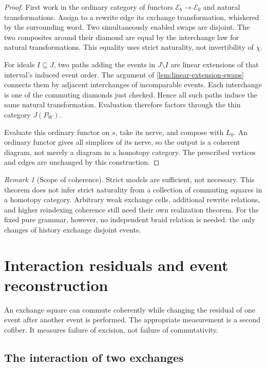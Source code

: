 \documentclass[11pt]{article}
\theoremstyle{definition}
\theoremstyle{remark}
\newtheorem{remark}[theorem]{Remark}
\begin{document}
\begin{proof}
First work in the ordinary category of functors $\mathcal E_b\to\mathcal E_0$ and natural transformations. Assign to a rewrite edge its exchange transformation, whiskered by the surrounding word. Two simultaneously enabled swaps are disjoint. The two composites around their diamond are equal by the interchange law for natural transformations. This equality uses strict naturality, not invertibility of $\chi$.

For ideals $I\subseteq J$, two paths adding the events in $J\setminus I$ are linear extensions of that interval's induced event order. The argument of \cref{lem:linear-extension-swaps} connects them by adjacent interchanges of incomparable events. Each interchange is one of the commuting diamonds just checked. Hence all such paths induce the same natural transformation. Evaluation therefore factors through the thin category $J(P_W)$.

Evaluate this ordinary functor on $s$, take its nerve, and compose with $L_0$. An ordinary functor gives all simplices of its nerve, so the output is a coherent diagram, not merely a diagram in a homotopy category. The prescribed vertices and edges are unchanged by this construction.
\end{proof}

\begin{remark}[Scope of coherence]
Strict models are sufficient, not necessary. This theorem does not infer strict naturality from a collection of commuting squares in a homotopy category. Arbitrary weak exchange cells, additional rewrite relations, and higher reindexing coherence still need their own realization theorem. For the fixed pure grammar, however, no independent braid relation is needed: the only changes of history exchange disjoint events.
\end{remark}

\section{Interaction residuals and event reconstruction}\label{sec:interaction-reconstruction}

An exchange square can commute coherently while changing the residual of one event after another event is performed. The appropriate measurement is a second cofiber. It measures failure of excision, not failure of commutativity.

\subsection{The interaction of two exchanges}
\end{document}
